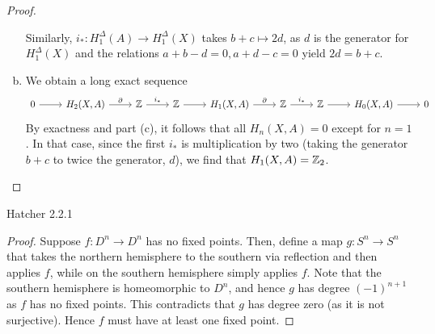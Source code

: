 \documentclass{../../mathnotes}
\begin{document}
\begin{proof}
\begin{enumerate}[(a)]
            Similarly, $i_*:H^\Delta_1(A)\to H^\Delta_1(X)$ takes $b+c\mapsto 2d$, as $d$ is the generator
            for $H^\Delta_1(X)$ and the relations $a+b-d=0,a+d-c=0$ yield $2d=b+c$.
        \item We obtain a long exact sequence
            \begin{equation}
                \begin{tikzcd}
                    0\ar{r} & H_2(X,A)\ar{r}{\partial} & \Z\ar{r}{i_*} & \Z\ar{r} & H_1(X,A)\ar{r}{\partial} & \Z\ar{r}{i_*} & \Z\ar{r} & H_0(X, A)\ar{r} &0
                \end{tikzcd}
                \label{cd:3}
            \end{equation}
            By exactness and part (c), it follows that all $H_n(X,A)=0$ except for $n=1$. In that case, since the 
            first $i_*$ is multiplication by two (taking the generator $b+c$ to twice the generator, $d$), we find that
            $H_1(X,A)=\mathbb{Z}_2$.
    \end{enumerate}
\end{proof}

\begin{prop}
    Hatcher 2.2.1
\end{prop}
\begin{proof}
    Suppose $f:D^n\to D^n$ has no fixed points. Then, define a map $g:S^n\to S^n$ that takes the northern hemisphere to
    the southern via reflection and then applies $f$, while on the southern hemisphere simply applies $f$. Note that
    the southern hemisphere is homeomorphic to $D^n$, and hence $g$ has degree $(-1)^{n+1}$ as $f$ has no fixed points.
    This contradicts that $g$ has degree zero (as it is not surjective). Hence $f$ must have at least one fixed point.
\end{proof}
\end{document}
